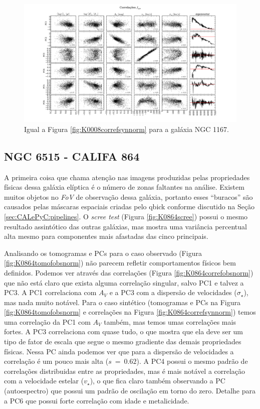 \begin{figure}
    \includegraphics[width=1.2\textwidth, angle=-90]{figuras/K0119-correl-f_syn_norm-PCvsPhys.pdf}
	\caption[Correlações PCs vs. par\^ametros f\'isicos - $f_{syn}$ - NGC 1167.]
	{Igual a Figura \ref{fig:K0008correfsynnorm} para a galáxia NGC 1167.}
    \label{fig:K0119correfsynnorm}
\end{figure}

\subsection{NGC 6515 - CALIFA 864}

A primeira coisa que chama atenção nas imagens produzidas pelas propriedades físicas dessa galáxia elíptica é o número
de zonas faltantes na análise. Existem muitos objetos no {\em FoV} de observação dessa galáxia, portanto esses
``buracos'' são causados pelas máscaras espaciais criadas pelo {\sc qbick} conforme discutido na Seção
\ref{sec:CALePyC:pipelines}. O {\em scree test} (Figura \ref{fig:K0864scree}) possui o mesmo resultado assintótico das
outras galáxias, mas mostra uma variância percentual alta mesmo para componentes mais afastadas das cinco principais.

Analisando os tomogramas e PCs para o caso observado (Figura \ref{fig:K0864tomofobsnorm}) não parecem refletir
comportamentos físicos bem definidos. Podemos ver através das correlações (Figura \ref{fig:K0864correfobsnorm}) que não
está claro que exista alguma correlação singular, salvo PC1 e talvez a PC3. A PC1 correlaciona com $A_V$ e a PC3 com a
dispersão de velocidades ($\sigma_\star$), mas nada muito notável. Para o caso sintético (tomogramas e PCs na Figura
\ref{fig:K0864tomofobsnorm} e correlações na Figura \ref{fig:K0864correfsynnorm}) temos uma correlação da PC1 com $A_V$
também, mas temos umas correlações mais fortes. A PC3 correlaciona com quase tudo, o que mostra que ela deve ser um tipo
de fator de escala que segue o mesmo gradiente das demais propriedades físicas. Nessa PC ainda podemos ver que para a
dispersão de velocidades a correlação é um pouco mais alta ($s\ =\ 0.62$). A PC4 possui o mesmo padrão de correlações
distribuidas entre as propriedades, mas é mais notável a correlação com a velocidade estelar ($v_\star$), o que fica
claro também observando a PC (autoespectro) que possui um padrão de oscilação em torno do zero. Detalhe para a PC6 que
possui forte correlação com idade e metalicidade.


